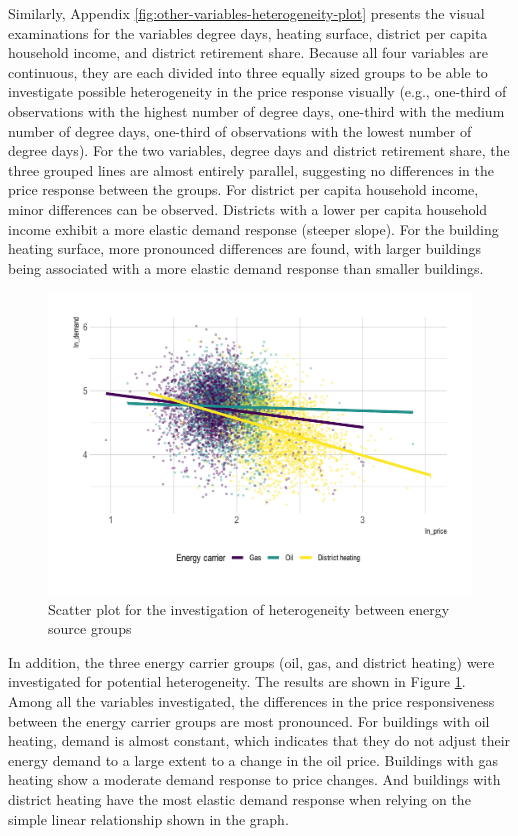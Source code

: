 \documentclass[12pt,twoside]{reedthesis}
\begin{document}
Similarly, Appendix \ref{fig:other-variables-heterogeneity-plot} presents the visual examinations for the variables degree days, heating surface, district per capita household income, and district retirement share. Because all four variables are continuous, they are each divided into three equally sized groups to be able to investigate possible heterogeneity in the price response visually (e.g., one-third of observations with the highest number of degree days, one-third with the medium number of degree days, one-third of observations with the lowest number of degree days). For the two variables, degree days and district retirement share, the three grouped lines are almost entirely parallel, suggesting no differences in the price response between the groups. For district per capita household income, minor differences can be observed. Districts with a lower per capita household income exhibit a more elastic demand response (steeper slope). For the building heating surface, more pronounced differences are found, with larger buildings being associated with a more elastic demand response than smaller buildings.
\begin{figure}

{\centering \includegraphics[width=0.8\linewidth]{figure/carrier_heterogeneity_plot} 

}

\caption{Scatter plot for the investigation of heterogeneity between energy source groups}\label{fig:heterogeneity-energy-carrier-plot}
\end{figure}
In addition, the three energy carrier groups (oil, gas, and district heating) were investigated for potential heterogeneity. The results are shown in Figure \ref{fig:heterogeneity-energy-carrier-plot}. Among all the variables investigated, the differences in the price responsiveness between the energy carrier groups are most pronounced. For buildings with oil heating, demand is almost constant, which indicates that they do not adjust their energy demand to a large extent to a change in the oil price. Buildings with gas heating show a moderate demand response to price changes. And buildings with district heating have the most elastic demand response when relying on the simple linear relationship shown in the graph.
\end{document}
